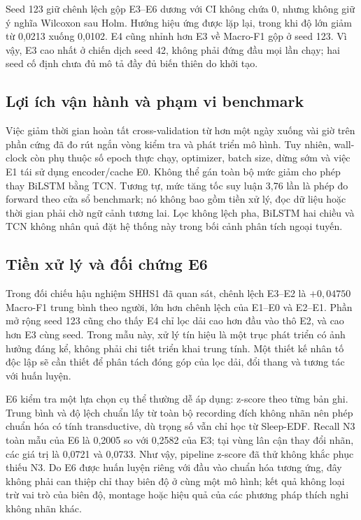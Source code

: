 Seed 123 giữ chênh lệch gộp E3--E6 dương với CI không chứa 0, nhưng không giữ ý nghĩa Wilcoxon sau Holm. Hướng hiệu ứng được lặp lại, trong khi độ lớn giảm từ 0,0213 xuống 0,0102. E4 cũng nhỉnh hơn E3 về Macro-F1 gộp ở seed 123. Vì vậy, E3 cao nhất ở chiến dịch seed 42, không phải đứng đầu mọi lần chạy; hai seed cố định chưa đủ mô tả đầy đủ biến thiên do khởi tạo.

\subsection{Lợi ích vận hành và phạm vi benchmark}

Việc giảm thời gian hoàn tất cross-validation từ hơn một ngày xuống vài giờ trên phần cứng đã đo rút ngắn vòng kiểm tra và phát triển mô hình. Tuy nhiên, wall-clock còn phụ thuộc số epoch thực chạy, optimizer, batch size, dừng sớm và việc E1 tái sử dụng encoder/cache E0. Không thể gán toàn bộ mức giảm cho phép thay BiLSTM bằng TCN. Tương tự, mức tăng tốc suy luận 3,76 lần là phép đo forward theo cửa sổ benchmark; nó không bao gồm tiền xử lý, đọc dữ liệu hoặc thời gian phải chờ ngữ cảnh tương lai. Lọc không lệch pha, BiLSTM hai chiều và TCN không nhân quả đặt hệ thống này trong bối cảnh phân tích ngoại tuyến.

\subsection{Tiền xử lý và đối chứng E6}

Trong đối chiếu hậu nghiệm SHHS1 đã quan sát, chênh lệch E3--E2 là $+0,04750$ Macro-F1 trung bình theo người, lớn hơn chênh lệch của E1--E0 và E2--E1. Phần mở rộng seed 123 cũng cho thấy E4 chỉ lọc dải cao hơn đầu vào thô E2, và cao hơn E3 cùng seed. Trong mẫu này, xử lý tín hiệu là một trục phát triển có ảnh hưởng đáng kể, không phải chi tiết triển khai trung tính. Một thiết kế nhân tố độc lập sẽ cần thiết để phân tách đóng góp của lọc dải, đổi thang và tương tác với huấn luyện.

E6 kiểm tra một lựa chọn cụ thể thường dễ áp dụng: z-score theo từng bản ghi. Trung bình và độ lệch chuẩn lấy từ toàn bộ recording đích không nhãn nên phép chuẩn hóa có tính transductive, dù trọng số vẫn chỉ học từ Sleep-EDF. Recall N3 toàn mẫu của E6 là 0,2005 so với 0,2582 của E3; tại vùng lân cận thay đổi nhãn, các giá trị là 0,0721 và 0,0733. Như vậy, pipeline z-score đã thử không khắc phục thiếu N3. Do E6 được huấn luyện riêng với đầu vào chuẩn hóa tương ứng, đây không phải can thiệp chỉ thay biên độ ở cùng một mô hình; kết quả không loại trừ vai trò của biên độ, montage hoặc hiệu quả của các phương pháp thích nghi không nhãn khác.

